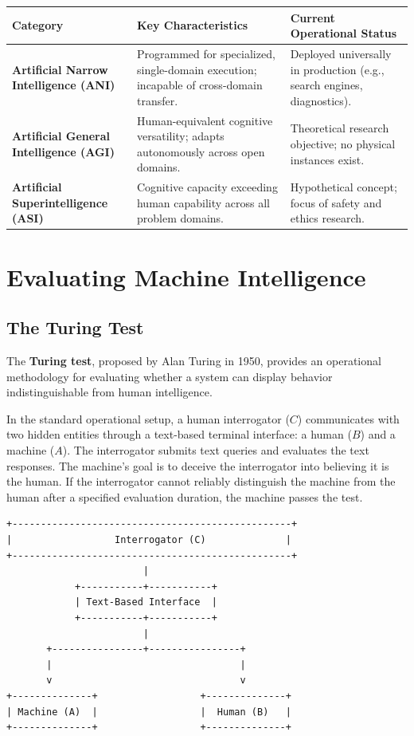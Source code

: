 \documentclass[12pt]{report}
\begin{document}
\begin{table}[htbp]
\centering
\begin{tabularx}{\textwidth}{@{} >{\raggedright\arraybackslash}p{3.5cm} X X @{}}
\toprule
\textbf{Category} & \textbf{Key Characteristics} & \textbf{Current Operational Status} \\
\midrule
\textbf{Artificial Narrow Intelligence (ANI)} & Programmed for specialized, single-domain execution; incapable of cross-domain transfer. & Deployed universally in production (e.g., search engines, diagnostics). \\
\textbf{Artificial General Intelligence (AGI)} & Human-equivalent cognitive versatility; adapts autonomously across open domains. & Theoretical research objective; no physical instances exist. \\
\textbf{Artificial Superintelligence (ASI)} & Cognitive capacity exceeding human capability across all problem domains. & Hypothetical concept; focus of safety and ethics research. \\
\bottomrule
\end{tabularx}
\end{table}


\section{Evaluating Machine Intelligence}

\subsection{The Turing Test}

The \textbf{Turing test}, proposed by Alan Turing in 1950, provides an operational methodology for evaluating whether a system can display behavior indistinguishable from human intelligence.

In the standard operational setup, a human interrogator ($C$) communicates with two hidden entities through a text-based terminal interface: a human ($B$) and a machine ($A$). The interrogator submits text queries and evaluates the text responses. The machine's goal is to deceive the interrogator into believing it is the human. If the interrogator cannot reliably distinguish the machine from the human after a specified evaluation duration, the machine passes the test.

\begin{verbatim}
+-------------------------------------------------+
|                  Interrogator (C)              |
+-------------------------------------------------+
                        |
            +-----------+-----------+
            | Text-Based Interface  |
            +-----------+-----------+
                        |
       +----------------+----------------+
       |                                 |
       v                                 v
+--------------+                  +--------------+
| Machine (A)  |                  |  Human (B)   |
+--------------+                  +--------------+
\end{verbatim}
\end{document}
